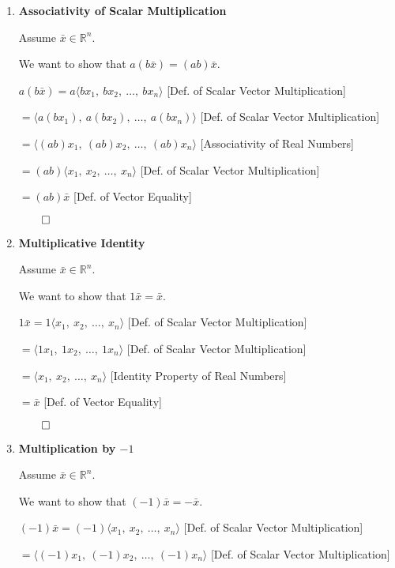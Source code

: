 \begin{proofbox}
\begin{enumerate}[label=\arabic*., resume=vecprops]

\item \textbf{Associativity of Scalar Multiplication}

Assume $\bar{x} \in \mathbb{R}^n$.

We want to show that $a(b\bar{x}) = (ab)\bar{x}$.

\quad $a(b\bar{x}) = a\langle bx_1,\ bx_2,\ \ldots,\ bx_n \rangle$ \hfill [Def. of Scalar Vector Multiplication]

\quad $= \langle a(bx_1),\ a(bx_2),\ \ldots,\ a(bx_n) \rangle$ \hfill [Def. of Scalar Vector Multiplication]

\quad $= \langle (ab)x_1,\ (ab)x_2,\ \ldots,\ (ab)x_n \rangle$ \hfill [Associativity of Real Numbers]

\quad $= (ab)\langle x_1,\ x_2,\ \ldots,\ x_n \rangle$ \hfill [Def. of Scalar Vector Multiplication]

\quad $= (ab)\bar{x}$ \hfill [Def. of Vector Equality]

\hfill $\qed$

\item \textbf{Multiplicative Identity}

Assume $\bar{x} \in \mathbb{R}^n$.

We want to show that $1\bar{x} = \bar{x}$.

\quad $1\bar{x} = 1\langle x_1,\ x_2,\ \ldots,\ x_n \rangle$ \hfill [Def. of Scalar Vector Multiplication]

\quad $= \langle 1x_1,\ 1x_2,\ \ldots,\ 1x_n \rangle$ \hfill [Def. of Scalar Vector Multiplication]

\quad $= \langle x_1,\ x_2,\ \ldots,\ x_n \rangle$ \hfill [Identity Property of Real Numbers]

\quad $= \bar{x}$ \hfill [Def. of Vector Equality]

\hfill $\qed$

\item \textbf{Multiplication by $-1$}

Assume $\bar{x} \in \mathbb{R}^n$.

We want to show that $(-1)\bar{x} = -\bar{x}$.

\quad $(-1)\bar{x} = (-1)\langle x_1,\ x_2,\ \ldots,\ x_n \rangle$ \hfill [Def. of Scalar Vector Multiplication]

\quad $= \langle (-1)x_1,\ (-1)x_2,\ \ldots,\ (-1)x_n \rangle$ \hfill [Def. of Scalar Vector Multiplication]


\end{enumerate}
\end{proofbox}
